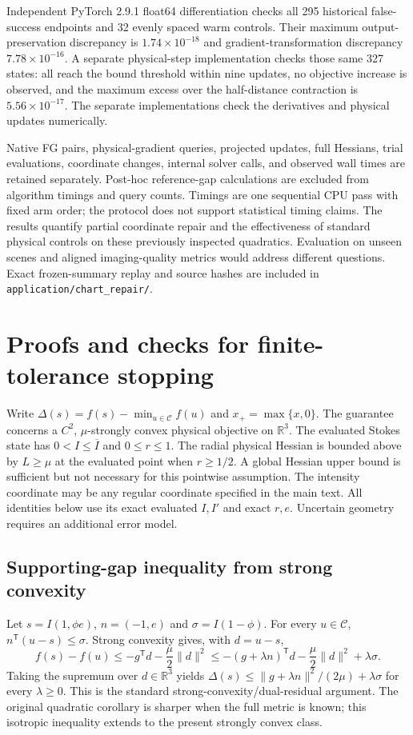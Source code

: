 \documentclass[10pt,a4paper]{article}
\begin{document}
Independent PyTorch 2.9.1 float64 differentiation checks all 295 historical false-success endpoints and 32 evenly spaced warm controls. Their maximum output-preservation discrepancy is $1.74\times10^{-18}$ and gradient-transformation discrepancy $7.78\times10^{-16}$. A separate physical-step implementation checks those same 327 states: all reach the bound threshold within nine updates, no objective increase is observed, and the maximum excess over the half-distance contraction is $5.56\times10^{-17}$. The separate implementations check the derivatives and physical updates numerically.

Native FG pairs, physical-gradient queries, projected updates, full Hessians, trial evaluations, coordinate changes, internal solver calls, and observed wall times are retained separately. Post-hoc reference-gap calculations are excluded from algorithm timings and query counts. Timings are one sequential CPU pass with fixed arm order; the protocol does not support statistical timing claims. The results quantify partial coordinate repair and the effectiveness of standard physical controls on these previously inspected quadratics. Evaluation on unseen scenes and aligned imaging-quality metrics would address different questions. Exact frozen-summary replay and source hashes are included in \nolinkurl{application/chart_repair/}.


\section{Proofs and checks for finite-tolerance stopping}
\label{sec:sstopproof}
Write $\Delta(s)=f(s)-\min_{u\in\mathcal C}f(u)$ and $x_+=\max\{x,0\}$.
The guarantee concerns a $C^2$, $\mu$-strongly convex physical objective on $\mathbb R^3$. The evaluated Stokes state has $0<I\le\overline I$ and $0\le r\le1$. The radial physical Hessian is bounded above by $L\ge\mu$ at the evaluated point when $r\ge1/2$. A global Hessian upper bound is sufficient but not necessary for this pointwise assumption. The intensity coordinate may be any regular coordinate specified in the main text. All identities below use its exact evaluated $I,I'$ and exact $r,e$. Uncertain geometry requires an additional error model.

\subsection{Supporting-gap inequality from strong convexity}
Let $s=I(1,\phi e)$, $n=(-1,e)$ and $\sigma=I(1-\phi)$. For every $u\in\mathcal C$, $n^{\mathsf T}(u-s)\le\sigma$. Strong convexity gives, with $d=u-s$,
\begin{equation}
 f(s)-f(u)\le-g^{\mathsf T}d-\frac\mu2\|d\|^2
 \le-(g+\lambda n)^{\mathsf T}d-\frac\mu2\|d\|^2+\lambda\sigma.
 \label{eq:sstrongsupport}
\end{equation}
Taking the supremum over $d\in\mathbb R^3$ yields $\Delta(s)\le\|g+\lambda n\|^2/(2\mu)+\lambda\sigma$ for every $\lambda\ge0$. This is the standard strong-convexity/dual-residual argument. The original quadratic corollary is sharper when the full metric is known; this isotropic inequality extends to the present strongly convex class.
\end{document}
